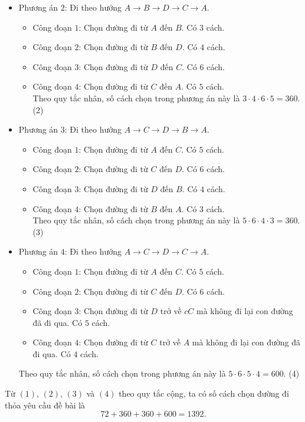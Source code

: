 \begin{vd}
{\begin{itemize}
\begin{itemize}
				            Theo quy tắc nhân, số cách chọn trong phương án này là $3\cdot 4 \cdot 3 \cdot 2= 72$. \qquad (1)
			      \end{itemize}
			\item Phương án $2$:
			      Đi theo hướng $A\longrightarrow B\longrightarrow D\longrightarrow C\longrightarrow A$.
			      \begin{itemize}
				      \item Công đoạn $1$: Chọn đường đi từ $A$ đến $B$. Có $3$ cách.
				      \item Công đoạn $2$: Chọn đường đi từ $B$ đến $D$. Có $4$ cách.
				      \item Công đoạn $3$: Chọn đường đi từ $D$ đến $C$. Có $6$ cách.
				      \item Công đoạn $4$: Chọn đường đi từ $C$ đến $A$. Có $5$ cách.\\
				            Theo quy tắc nhân, số cách chọn trong phương án này là $3\cdot 4 \cdot 6 \cdot 5= 360$. \qquad (2)
			      \end{itemize}
			\item Phương án $3$:
			      Đi theo hướng $A\longrightarrow C\longrightarrow D\longrightarrow B\longrightarrow A$.
			      \begin{itemize}
				      \item Công đoạn $1$: Chọn đường đi từ $A$ đến $C$. Có $5$ cách.
				      \item Công đoạn $2$: Chọn đường đi từ $C$ đến $D$. Có $6$ cách.
				      \item Công đoạn $3$: Chọn đường đi từ $D$ đến $B$. Có $4$ cách.
				      \item Công đoạn $4$: Chọn đường đi từ $B$ đến $A$. Có $3$ cách.\\
				            Theo quy tắc nhân, số cách chọn trong phương án này là $5\cdot 6 \cdot 4 \cdot 3=360$. \qquad (3)
			      \end{itemize}
			\item Phương án $4$:
			      Đi theo hướng $A\longrightarrow C\longrightarrow D\longrightarrow C \longrightarrow A$.
			      \begin{itemize}
				      \item Công đoạn $1$: Chọn đường đi từ $A$ đến $C$. Có $5$ cách.
				      \item Công đoạn $2$: Chọn đường đi từ $C$ đến $D$. Có $6$ cách.
				      \item Công đoạn $3$: Chọn đường đi từ $D$ trở về $cC$ mà không đi lại con đường đã đi qua. Có $5$ cách.
				      \item Công đoạn $4$: Chọn đường đi từ $C$ trở về $A$ mà không đi lại con đường đã đi qua. Có $4$ cách.
			      \end{itemize}
			      Theo quy tắc nhân, số cách chọn trong phương án này là $5\cdot 6 \cdot 5 \cdot 4= 600$. \qquad (4)
		\end{itemize}
		Từ $(1)$, $(2)$, $(3)$ và $(4)$ theo quy tắc cộng, ta có số cách chọn đường đi thỏa yêu cầu đề bài là $$72+360+360+600=1392.$$
	}
\end{vd}
